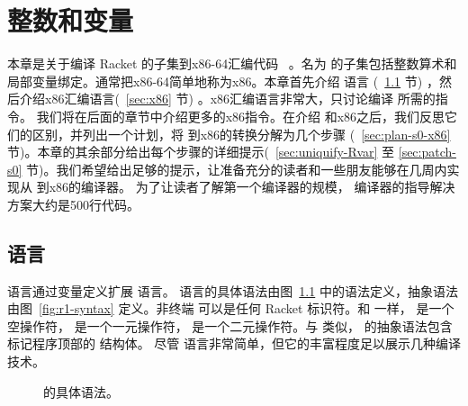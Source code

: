 \documentclass[11pt]{book}
\begin{document}
\chapter{整数和变量}
\label{ch:Rvar}

本章是关于编译 Racket 的子集到x86-64汇编代码~\citep{Intel:2015aa} 。名为 \LangVar{} 的子集包括整数算术和局部变量绑定。通常把x86-64简单地称为x86。本章首先介绍
\LangVar{} 语言 (~\ref{sec:s0} 节) ，然后介绍x86汇编语言(~\ref{sec:x86} 节) 。x86汇编语言非常大，只讨论编译
\LangVar{} 所需的指令。 我们将在后面的章节中介绍更多的x86指令。在介绍 \LangVar{} 和x86之后，我们反思它们的区别，并列出一个计划，将 \LangVar{}
到x86的转换分解为几个步骤 (~\ref{sec:plan-s0-x86} 节)。本章的其余部分给出每个步骤的详细提示(~\ref{sec:uniquify-Rvar} 至 \ref{sec:patch-s0} 节)。我们希望给出足够的提示，让准备充分的读者和一些朋友能够在几周内实现从 \LangVar{} 到x86的编译器。 为了让读者了解第一个编译器的规模， \LangVar{} 编译器的指导解决方案大约是500行代码。

\section{\LangVar{} 语言}
\label{sec:s0}

\LangVar{} 语言通过变量定义扩展 \LangInt{} 语言。 \LangVar{} 语言的具体语法由图~\ref{fig:r1-concrete-syntax} 中的语法定义，抽象语法由图~\ref{fig:r1-syntax} 定义。非终端
\Var{} 可以是任何 Racket 标识符。和 \LangInt{} 一样， 是一个空操作符， \key{-} 是一个一元操作符， \key{+} 是一个二元操作符。与 \LangInt{} 类似， \LangVar{} 的抽象语法包含标记程序顶部的 结构体。
尽管 \LangVar{} 语言非常简单，但它的丰富程度足以展示几种编译技术。

\begin{figure}[tp]
\centering
{}
\caption{ \LangVar{} 的具体语法。}
\label{fig:r1-concrete-syntax}
\end{figure}
\end{document}
